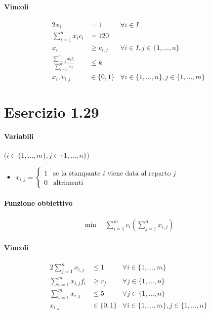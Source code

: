 \documentclass{article}
\begin{document}
\paragraph{Vincoli}
\begin{alignat}{2}
  x_i &= 1 &\forall i \in I \\
  \sum_{i=1}^n x_i c_i &= 120 &\\
  x_i &\geq v_{i,j} &\forall i \in I, j \in \{1,\ldots,n\} \\
  \frac{\sum_{i=1}^n x_i t_i}{\sum_{i=1}^n x_i} &\leq k & \\
  x_i, v_{i,j} &\in \{0,1\} &\forall i \in \{1,\ldots,n\}, j \in \{1,\ldots,m\}
\end{alignat}

\pagebreak
\section{Esercizio 1.29}

\paragraph{Variabili} ($i \in \{1,\ldots,m\}, j \in \{1,\ldots,n\}$)
\begin{itemize}
  \item $x_{i,j} = \begin{cases}
      1 & \text{se la stampante }i \text{ viene data al reparto }j \\
      0 & \text{altrimenti}
  \end{cases}$
\end{itemize}

\paragraph{Funzione obbiettivo}
\begin{align*}
  \min \quad \sum_{i=1}^m c_i (\sum_{j=1}^n x_{i,j})
\end{align*}

\paragraph{Vincoli}
\begin{alignat}{2}
  \sum_{j=1}^n x_{i,j} &\leq 1 &\forall i \in \{1,\ldots,m\} \\
  \sum_{i=1}^m x_{i,j} f_i &\geq r_j &\forall j \in \{1,\ldots,n\} \\
  \sum_{i=1}^m x_{i,j} &\leq 5 &\forall j \in \{1,\ldots,n\} \\
  x_{i,j} &\in \{0,1\} &\forall i \in \{1,\ldots,m\}, j \in \{1,\ldots,n\}
\end{alignat}
\end{document}
